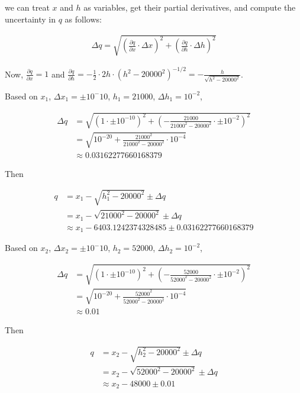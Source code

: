 \documentclass[9pt]{article}
\begin{document}
we can treat $x$ and $h$ as variables, get their partial derivatives, and compute the uncertainty in $q$ as follows:

\begin{align*}
  \Delta q = \sqrt{(\frac{\partial q}{\partial x} \cdot \Delta x)^2 + (\frac{\partial q}{\partial h} \cdot \Delta h)^2}
\end{align*}

Now, $\frac{\partial q}{\partial x} = 1$ and $\frac{\partial q}{\partial h} = -\frac{1}{2} \cdot 2h \cdot (h^2 - 20000^2)^{-1/2} = -\frac{h}{\sqrt{h^2 - 20000^2}}$.

Based on $x_1$, $\Delta x_1 = \pm 10^-10$, $h_1 = 21000$, $\Delta h_1 = 10^{-2}$,

\begin{align*}
  \Delta q &= \sqrt{(1 \cdot \pm 10^{-10})^2 + (-\frac{21000}{21000^2 - 20000^2} \cdot \pm 10^{-2})^2} \\
           &= \sqrt{10^{-20} + \frac{21000^2}{21000^2 - 20000^2} \cdot 10^{-4}} \\
           &\approx 0.03162277660168379
\end{align*}

Then

\begin{align*}
  q &= x_1 - \sqrt{h_1^2 - 20000^2} \pm \Delta q \\
    &= x_1 - \sqrt{21000^2 - 20000^2} \pm \Delta q \\
    &\approx x_1 - 6403.1242374328485 \pm 0.03162277660168379
\end{align*}

Based on $x_2$, $\Delta x_2 = \pm 10^-10$, $h_2 = 52000$, $\Delta h_2 = 10^{-2}$,

\begin{align*}
  \Delta q &= \sqrt{(1 \cdot \pm 10^{-10})^2 + (-\frac{52000}{52000^2 - 20000^2} \cdot \pm 10^{-2})^2} \\
           &= \sqrt{10^{-20} + \frac{52000^2}{52000^2 - 20000^2} \cdot 10^{-4}} \\
           &\approx 0.01
\end{align*}

Then

\begin{align*}
  q &= x_2 - \sqrt{h_2^2 - 20000^2} \pm \Delta q \\
    &= x_2 - \sqrt{52000^2 - 20000^2} \pm \Delta q \\
    &\approx x_2 - 48000 \pm 0.01
\end{align*}
\end{document}
